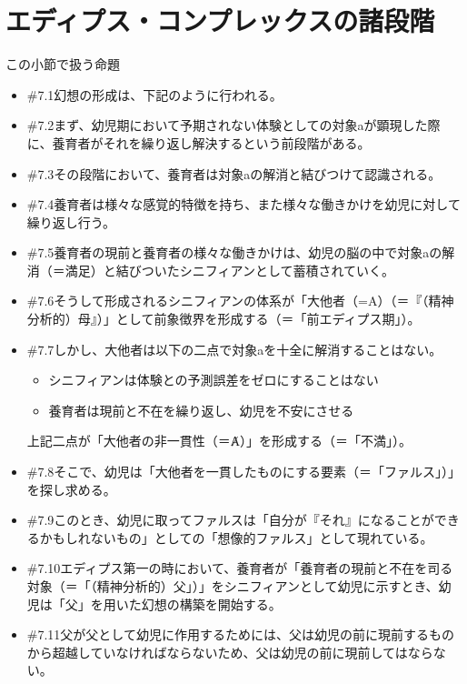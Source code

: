 \section{エディプス・コンプレックスの諸段階}\label{ux30a8ux30c7ux30a3ux30d7ux30b9ux30b3ux30f3ux30d7ux30ecux30c3ux30afux30b9ux306eux8af8ux6bb5ux968e}

\begin{note}{この小節で扱う命題}
  \begin{itemize}
    \tightlist
    \item{\#7.1}幻想の形成は、下記のように行われる。
    \item{\#7.2}まず、幼児期において予期されない体験としての対象aが顕現した際に、養育者がそれを繰り返し解決するという前段階がある。
    \item{\#7.3}その段階において、養育者は対象aの解消と結びつけて認識される。
    \item{\#7.4}養育者は様々な感覚的特徴を持ち、また様々な働きかけを幼児に対して繰り返し行う。
    \item{\#7.5}養育者の現前と養育者の様々な働きかけは、幼児の脳の中で対象aの解消（＝満足）と結びついたシニフィアンとして蓄積されていく。
    \item{\#7.6}そうして形成されるシニフィアンの体系が「大他者（=A）（＝『（精神分析的）母』）」として前象徴界を形成する（＝「前エディプス期」）。
    \item{\#7.7}しかし、大他者は以下の二点で対象aを十全に解消することはない。
      \begin{itemize}
        \tightlist
        \item シニフィアンは体験との予測誤差をゼロにすることはない
        \item 養育者は現前と不在を繰り返し、幼児を不安にさせる
      \end{itemize}上記二点が「大他者の非一貫性（＝Ⱥ）」を形成する（＝「不満」）。
    \item{\#7.8}そこで、幼児は「大他者を一貫したものにする要素（＝「ファルス」）」を探し求める。
    \item{\#7.9}このとき、幼児に取ってファルスは「自分が『それ』になることができるかもしれないもの」としての「想像的ファルス」として現れている。
    \item{\#7.10}エディプス第一の時において、養育者が「養育者の現前と不在を司る対象（＝「（精神分析的）父」）」をシニフィアンとして幼児に示すとき、幼児は「父」を用いた幻想の構築を開始する。
    \item{\#7.11}父が父として幼児に作用するためには、父は幼児の前に現前するものから超越していなければならないため、父は幼児の前に現前してはならない。

\end{itemize}
\end{note}
